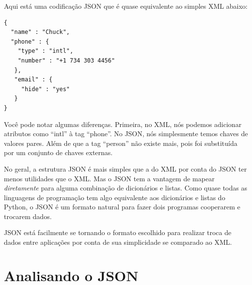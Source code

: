 Aqui está uma codificação JSON que é quase equivalente ao simples XML abaixo:

\beforeverb
\begin{verbatim}
{
  "name" : "Chuck",
  "phone" : {
    "type" : "intl",
    "number" : "+1 734 303 4456"
   },
   "email" : {
     "hide" : "yes"
   }
}
\end{verbatim}
\afterverb
%
Você pode notar algumas diferenças. Primeira, no XML, nós podemos adicionar
atributos como ``intl'' à tag ``phone''. No JSON, nós simplesmente temos chaves de
valores pares. Além de que a tag ``person'' não existe mais, pois foi substituída por
um conjunto de chaves externas.

No geral, a estrutura JSON é mais simples que a do XML por conta do JSON ter menos
utilidades que o XML. Mas o JSON tem a vantagem de mapear {\em diretamente} para alguma
combinação de dicionários e listas. Como quase todas as linguagens de programação 
tem algo equivalente aos dicionários e listas do Python, o JSON é um formato natural 
para fazer dois programas cooperarem e trocarem dados.

JSON está facilmente se tornando o formato escolhido para realizar troca de dados
entre aplicações por conta de sua simplicidade se comparado ao XML.

\section{Analisando o JSON}

